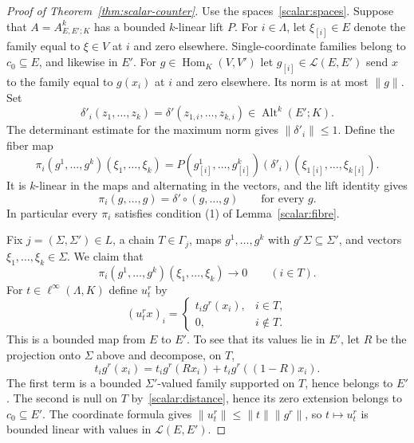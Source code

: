 \documentclass[11pt]{amsart}
\theoremstyle{definition}
\theoremstyle{remark}
\numberwithin{equation}{section}
\newcommand{\cL}{\mathcal L}
\newcommand{\Alt}{\operatorname{Alt}}
\newcommand{\linf}{\ell^\infty}
\newcommand{\norm}[1]{\lVert #1\rVert}
\begin{document}
\begin{proof}[Proof of Theorem~\ref{thm:scalar-counter}]
Use the spaces~\eqref{scalar:spaces}. Suppose that $A=A^k_{E,E';K}$ has a bounded $k$\nobreakdash-linear
lift $P$. For $i\in\Lambda$, let $\xi_{[i]}\in E$ denote the family equal to $\xi\in V$ at $i$ and zero
elsewhere. Single-coordinate families belong to $c_0\subseteq E$, and likewise in $E'$. For
$g\in\operatorname{Hom}_K(V,V')$ let $g_{[i]}\in\cL(E,E')$ send $x$ to the family equal to $g(x_i)$ at
$i$ and zero elsewhere. Its norm is at most $\norm g$. Set
\[
 \delta'_i(z_1,\dots,z_k)=\delta'(z_{1,i},\dots,z_{k,i})\in\Alt^k(E';K).
\]
The determinant estimate for the maximum norm gives $\norm{\delta'_i}\le1$. Define the fiber map
\begin{equation}\label{scalar:fibre-map}
 \pi_i(g^1,\dots,g^k)(\xi_1,\dots,\xi_k)
 =P(g^1_{[i]},\dots,g^k_{[i]})(\delta'_i)
       (\xi_{1[i]},\dots,\xi_{k[i]}).
\end{equation}
It is $k$\nobreakdash-linear in the maps and alternating in the vectors, and the lift identity gives
\begin{equation}\label{scalar:fibre-diagonal}
 \pi_i(g,\dots,g)=\delta'\circ(g,\dots,g)
 \qquad\text{for every }g.
\end{equation}
In particular every $\pi_i$ satisfies condition (1) of Lemma~\ref{scalar:fibre}.

Fix $j=(\Sigma,\Sigma')\in L$, a chain $T\in\Gamma_j$, maps $g^1,\dots,g^k$ with
$g^r\Sigma\subseteq\Sigma'$, and vectors $\xi_1,\dots,\xi_k\in\Sigma$. We claim that
\begin{equation}\label{scalar:chain-decay}
 \pi_i(g^1,\dots,g^k)(\xi_1,\dots,\xi_k)\longrightarrow0
 \qquad(i\in T).
\end{equation}
For $t\in\linf(\Lambda,K)$ define $u^r_t$ by
\[
 (u^r_t x)_i=\begin{cases}t_i g^r(x_i),&i\in T,\\0,&i\notin T.\end{cases}
\]
This is a bounded map from $E$ to $E'$. To see that its values lie in $E'$, let $R$ be the projection
onto $\Sigma$ above and decompose, on $T$,
\[
 t_i g^r(x_i)=t_i g^r(Rx_i)+t_i g^r((1-R)x_i).
\]
The first term is a bounded $\Sigma'$\nobreakdash-valued family supported on $T$, hence belongs to $E'$.
The second is null on $T$ by~\eqref{scalar:distance}, hence its zero extension belongs to $c_0\subseteq E'$.
The coordinate formula gives $\norm{u^r_t}\le\norm t\norm{g^r}$, so $t\mapsto u^r_t$ is bounded linear
with values in $\cL(E,E')$.


\end{proof}
\end{document}
